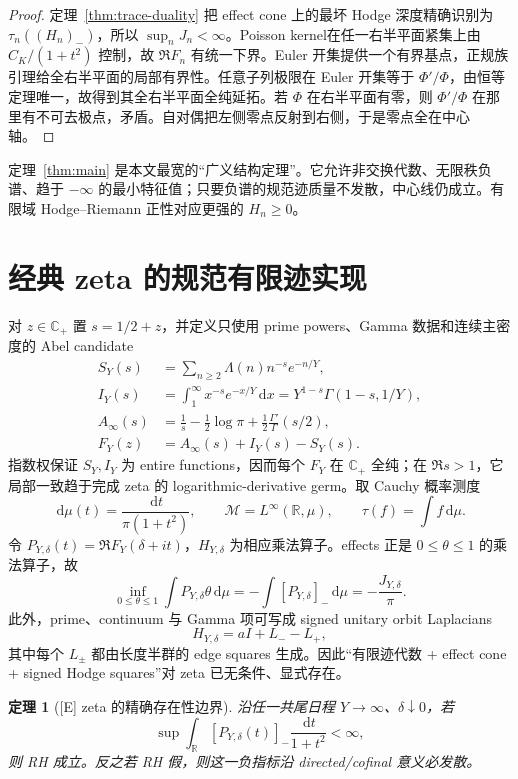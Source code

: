 \documentclass[UTF8,11pt,a4paper]{ctexart}
\newtheorem{theorem}{定理}[section]
\theoremstyle{definition}
\theoremstyle{remark}
\newcommand{\C}{\mathbb C}
\newcommand{\R}{\mathbb R}
\newcommand{\dd}{\,\mathrm d}
\newcommand{\1}{\mathbf 1}
\newcommand{\cM}{\mathcal M}
\newcommand{\statusE}{\textnormal{[E]}}
\begin{document}
\begin{proof}
定理~\ref{thm:trace-duality} 把 effect cone 上的最坏 Hodge 深度精确识别为 $\tau_n((H_n)_-)$，所以 $\sup_nJ_n<\infty$。Poisson kernel在任一右半平面紧集上由 $C_K/(1+t^2)$ 控制，故 $\Re F_n$ 有统一下界。Euler 开集提供一个有界基点，正规族引理给全右半平面的局部有界性。任意子列极限在 Euler 开集等于 $\Phi'/\Phi$，由恒等定理唯一，故得到其全右半平面全纯延拓。若 $\Phi$ 在右半平面有零，则 $\Phi'/\Phi$ 在那里有不可去极点，矛盾。自对偶把左侧零点反射到右侧，于是零点全在中心轴。
\end{proof}

定理~\ref{thm:main} 是本文最宽的“广义结构定理”。它允许非交换代数、无限秩负谱、趋于 $-\infty$ 的最小特征值；只要负谱的规范迹质量不发散，中心线仍成立。有限域 Hodge--Riemann 正性对应更强的 $H_n\geq0$。

\section{经典 zeta 的规范有限迹实现}

对 $z\in\C_+$ 置 $s=1/2+z$，并定义只使用 prime powers、Gamma 数据和连续主密度的 Abel candidate
\begin{align*}
 S_Y(s)&=\sum_{n\geq2}\Lambda(n)n^{-s}e^{-n/Y},\\
 I_Y(s)&=\int_1^\infty x^{-s}e^{-x/Y}\dd x
       =Y^{1-s}\Gamma(1-s,1/Y),\\
 A_\infty(s)&=\frac1s-\frac12\log\pi
              +\frac12\frac{\Gamma'}{\Gamma}(s/2),\\
 F_Y(z)&=A_\infty(s)+I_Y(s)-S_Y(s).
\end{align*}
指数权保证 $S_Y,I_Y$ 为 entire functions，因而每个 $F_Y$ 在 $\C_+$ 全纯；在 $\Re s>1$，它局部一致趋于完成 zeta 的 logarithmic-derivative germ。取 Cauchy 概率测度
\[
  \dd\mu(t)=\frac{\dd t}{\pi(1+t^2)},\qquad
  \cM=L^\infty(\R,\mu),\qquad \tau(f)=\int f\dd\mu.
\]
令 $P_{Y,\delta}(t)=\Re F_Y(\delta+it)$，$H_{Y,\delta}$ 为相应乘法算子。effects 正是 $0\leq\theta\leq1$ 的乘法算子，故
\[
 \inf_{0\leq\theta\leq1}\int P_{Y,\delta}\theta\dd\mu
 =-\int[P_{Y,\delta}]_-\dd\mu=-\frac{J_{Y,\delta}}\pi.
\]
此外，prime、continuum 与 Gamma 项可写成 signed unitary orbit Laplacians
\[
  H_{Y,\delta}=aI+L_- -L_+,
\]
其中每个 $L_\pm$ 都由长度半群的 edge squares 生成。因此“有限迹代数 + effect cone + signed Hodge squares”对 zeta 已无条件、显式存在。

\begin{theorem}[\statusE{} zeta 的精确存在性边界]
沿任一共尾日程 $Y\to\infty$、$\delta\downarrow0$，若
\[
  \sup\int_\R[P_{Y,\delta}(t)]_-\frac{\dd t}{1+t^2}<\infty,
\]
则 RH 成立。反之若 RH 假，则这一负指标沿 directed/cofinal 意义必发散。
\end{theorem}
\end{document}
